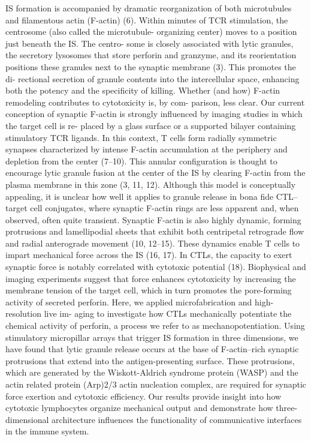 IS formation is accompanied by dramatic reorganization of both microtubules and filamentous actin (F-actin) (6). Within minutes of TCR stimulation, the centrosome (also called the microtubule- organizing center) moves to a position just beneath the IS. The centro- some is closely associated with lytic granules, the secretory lysosomes that store perforin and granzyme, and its reorientation positions these granules next to the synaptic membrane (3). This promotes the di- rectional secretion of granule contents into the intercellular space, enhancing both the potency and the specificity of killing. Whether (and how) F-actin remodeling contributes to cytotoxicity is, by com- parison, less clear. Our current conception of synaptic F-actin is strongly influenced by imaging studies in which the target cell is re- placed by a glass surface or a supported bilayer containing stimulatory TCR ligands. In this context, T cells form radially symmetric synapses characterized by intense F-actin accumulation at the periphery and depletion from the center (7–10). This annular configuration is thought to encourage lytic granule fusion at the center of the IS by clearing F-actin from the plasma membrane in this zone (3, 11, 12). Although this model is conceptually appealing, it is unclear how well it applies to granule release in bona fide CTL–target cell conjugates, where synaptic F-actin rings are less apparent and, when observed, often quite transient. Synaptic F-actin is also highly dynamic, forming protrusions and lamellipodial sheets that exhibit both centripetal retrograde flow and radial anterograde movement (10, 12–15). These dynamics enable T cells to impart mechanical force across the IS (16, 17). In CTLs, the capacity to exert synaptic force is notably correlated with cytotoxic potential (18). Biophysical and imaging experiments suggest that force enhances cytotoxicity by increasing the membrane tension of the target cell, which in turn promotes the pore-forming activity of secreted perforin. Here, we applied microfabrication and high-resolution live im- aging to investigate how CTLs mechanically potentiate the chemical activity of perforin, a process we refer to as mechanopotentiation. Using stimulatory micropillar arrays that trigger IS formation in three dimensions, we have found that lytic granule release occurs at the base of F-actin–rich synaptic protrusions that extend into the antigen-presenting surface. These protrusions, which are generated by the Wiskott-Aldrich syndrome protein (WASP) and the actin related protein (Arp)2/3 actin nucleation complex, are required for synaptic force exertion and cytotoxic efficiency. Our results provide insight into how cytotoxic lymphocytes organize mechanical output and demonstrate how three-dimensional architecture influences the functionality of communicative interfaces in the immune system.

